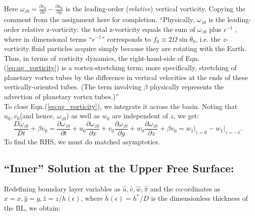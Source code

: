 \documentclass{article}
\newcommand{\pd}[2]{\frac{\partial{#1}}{\partial{#2}}}
\begin{document}
Here $\boxed{\omega_{z0} = \pd{v_{0}}{x} - \pd{u_{0}}{y}}$ is the leading-order (\textit{relative}) vertical vorticity. Copying the comment from the assignment here for completion.
``Physically, $\omega_{z0}$ is the leading-order relative z-vorticity: the total z-vorticity equals the sum of $\omega_{z0}$ plus $\epsilon^{-1}$ , where in dimensional terms ``$\epsilon^{-1}$''
corresponds to $f_{0} \equiv 2\Omega \sin{\theta_{0}}$, i.e. the $z$-vorticity fluid particles acquire simply because they are rotating with the Earth. Thus, in terms of vorticity dynamics, the right-hand-side of Eqn.(\ref{eq:qg_vorticity}) is a vortex-stretching term; more specifically, stretching of planetary vortex tubes by the difference in vertical velocities at the ends of these vertically-oriented tubes. (The term involving $\beta$ physically represents the advection of planetary vortex tubes.)''\\
%
To close Eqn.(\ref{eq:qg_vorticity}), we integrate it across the basin. Noting that $u_{0}, v_{0}$(and hence, $\omega_{z0}$) as well as $w_{0}$ are independent of $z$, we get:
\begin{equation}\label{eq:qg-half-done}
 \boxed{\frac{D\omega_{z0}}{Dt} + \beta v_{0} = \pd{\omega_{z0}}{t} + u_{0}\pd{\omega_{z0}}{x} + v_{0}\pd{\omega_{z0}}{y} + w_{0}\pd{\omega_{z0}}{z} + \beta v_{0} = w_{1}\big|_{z=0} - w_{1}\big|_{z=-1} }.
\end{equation}
%
To find the RHS, we must do matched asymptotics. 
\subsection{``Inner'' Solution at the Upper Free Surface:}
Redefining boundary layer variables as $\hat{u}, \hat{v}, \hat{w}, \hat{\pi}$ and the co-ordinates as $\hat{x} = x, \hat{y} = y, \hat{z}= z/h(\epsilon)$, where $h(\epsilon) = h^{*}/D$ is the dimensionless thickness of the BL, we obtain:
\end{document}
